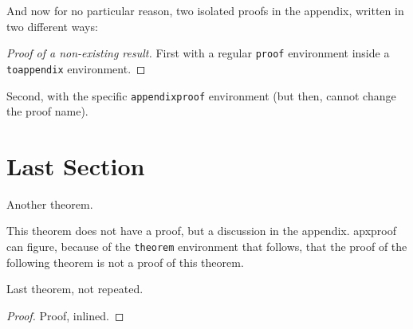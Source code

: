 \begin{toappendix}
And now for no particular reason, two isolated proofs in the appendix,
  written in two different ways:

  \begin{proof}[Proof of a non-existing result]
    First with a regular \texttt{proof} environment inside a
    \texttt{toappendix} environment.
  \end{proof}
\end{toappendix}

\begin{appendixproof}
  Second, with the specific \texttt{appendixproof} environment (but then,
  cannot change the proof name).
\end{appendixproof}

\section{Last Section}

\begin{theoremrep}
  Another theorem.
\end{theoremrep}

\begin{toappendix}
  This theorem does not have a proof, but a discussion in the appendix.
  \textsf{apxproof} can figure, because of the \verb|theorem| environment
  that follows, that the proof of the following theorem is not a proof of
  this theorem.
\end{toappendix}

\begin{theorem}
  Last theorem, not repeated.
\end{theorem}

\begin{proof}
  Proof, inlined.
\end{proof}





